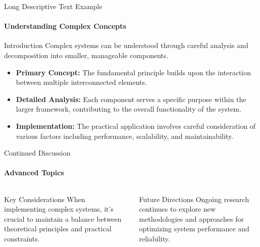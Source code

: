 \documentclass[10pt,aspectratio=169]{beamer}
\begin{document}
\begin{frame}{Long Descriptive Text Example}
    \framesubtitle{Understanding Complex Concepts}
    \begin{block}{Introduction}
        Complex systems can be understood through careful analysis and decomposition 
        into smaller, manageable components.
    \end{block}
    
    \begin{itemize}
        \item<1-> \textbf{Primary Concept:} The fundamental principle builds upon 
        the interaction between multiple interconnected elements.
        
        \item<2-> \textbf{Detailed Analysis:} Each component serves a specific 
        purpose within the larger framework, contributing to the overall 
        functionality of the system.
        
        \item<3-> \textbf{Implementation:} The practical application involves 
        careful consideration of various factors including performance, 
        scalability, and maintainability.
    \end{itemize}
\end{frame}

\begin{frame}{Continued Discussion}
    \framesubtitle{Advanced Topics}
    \begin{columns}[T]
            \begin{alertblock}{Key Considerations}
                When implementing complex systems, it's crucial to maintain 
                a balance between theoretical principles and practical constraints.
            \end{alertblock}
            
            \begin{block}{Future Directions}
                Ongoing research continues to explore new methodologies and 
                approaches for optimizing system performance and reliability.
            \end{block}
    \end{columns}
\end{frame}

\backmatter %
\end{document}
